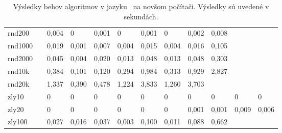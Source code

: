 \begin{landscape}
\begin{table}[h]
\begin{tabular}{llllllllllll}
		rnd200  &       & 0,004  & 0       & 0,001    & 0        & 0,001    & 0       & 0,002  & 0,008      &         &         \\
		rnd1000 &       & 0,019  & 0,001   & 0,007    & 0,004    & 0,015    & 0,004   & 0,016  & 0,105      &         &         \\
		rnd2000 &       & 0,045  & 0,004   & 0,020    & 0,013    & 0,048    & 0,013   & 0,048  & 0,303      &         &         \\
		rnd10k  &       & 0,384  & 0,101   & 0,120    & 0,294    & 0,984    & 0,313   & 0,929  & 2,827      &         &         \\
		rnd20k  &       & 1,337  & 0,390   & 0,478    & 1,224    & 3,833    & 1,260   & 3,703  &            &         &         \\
		zly10   &       & 0      & 0       & 0        & 0        & 0        & 0       & 0      & 0          & 0       & 0       \\
		zly20   &       & 0      & 0       & 0        & 0        & 0        & 0       & 0,001  & 0,001      & 0,009   & 0,006   \\
		zly100  &       & 0,027  & 0,016   & 0,037    & 0,003    & 0,100    & 0,011   & 0,088  & 0,662      &         &         \\ \hline
	\end{tabular}
	\caption{Výsledky behov algoritmov v jazyku \Java\ na novšom počítači. Výsledky sú uvedené v sekundách.}
	\label{table:java}
\end{table}
\end{landscape}
